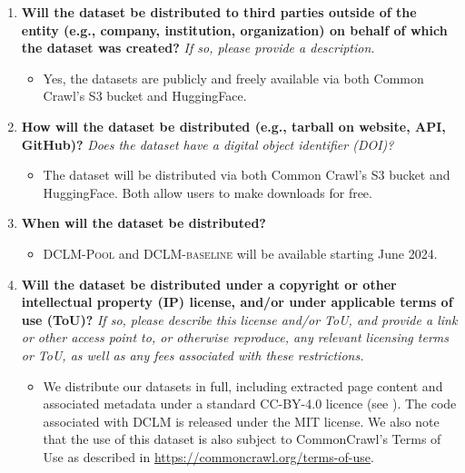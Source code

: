 \documentclass{article}
\newcommand{\dclm}{\textsc{DCLM}\xspace}
\newcommand{\rawpool}{\textsc{DCLM-Pool}\xspace}
\newcommand{\hqpool}{\textsc{DCLM-baseline}\xspace}
\begin{document}
\begin{enumerate}[label=Q\arabic*, resume]

\item \textbf{Will the dataset be distributed to third parties outside of the entity (e.g., company, institution, organization) on behalf of which the dataset was created?} \textit{If so, please provide a description.}

\begin{itemize}
\item Yes, the datasets are publicly and freely available via both Common Crawl's S3 bucket and HuggingFace.
\end{itemize}

\item \textbf{How will the dataset be distributed (e.g., tarball on website, API, GitHub)?} \textit{Does the dataset have a digital object identifier (DOI)?}

\begin{itemize}
\item The dataset will be distributed via both Common Crawl's S3 bucket and HuggingFace. Both allow users to make downloads for free.
\end{itemize}

\item \textbf{When will the dataset be distributed?}

\begin{itemize}
\item \rawpool and \hqpool will be available starting June 2024.
\end{itemize}

\item \textbf{Will the dataset be distributed under a copyright or other intellectual property (IP) license, and/or under applicable terms of use (ToU)?} \textit{If so, please describe this license and/or ToU, and provide a link or other access point to, or otherwise reproduce, any relevant licensing terms or ToU, as well as any fees associated with these restrictions.}

\begin{itemize}
\item We distribute our datasets in full, including extracted page content and associated metadata under a standard CC-BY-4.0 licence (see ). The code associated with \dclm is released under the MIT license. We also note that the use of this dataset is also subject to CommonCrawl’s Terms of Use as described in \url{https://commoncrawl.org/terms-of-use}.
\end{itemize}


\end{enumerate}
\end{document}
